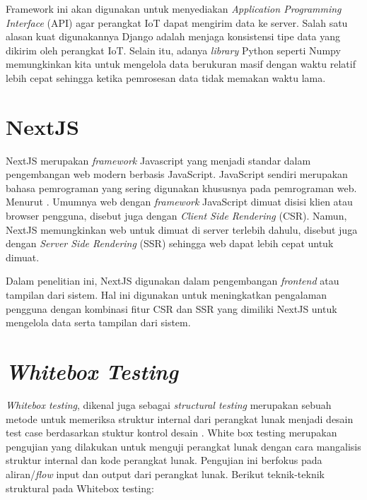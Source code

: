 Framework ini akan digunakan untuk menyediakan \textit{Application Programming Interface} (API) agar perangkat IoT dapat mengirim data ke server. Salah satu alasan kuat digunakannya Django adalah menjaga konsistensi tipe data yang dikirim oleh perangkat IoT. Selain itu, adanya \textit{library} Python seperti Numpy memungkinkan kita untuk mengelola data berukuran masif dengan waktu relatif lebih cepat sehingga ketika pemrosesan data tidak memakan waktu lama.

\section{NextJS}

NextJS merupakan \textit{framework} Javascript yang menjadi standar dalam pengembangan web modern berbasis JavaScript. JavaScript sendiri merupakan bahasa pemrograman yang sering digunakan khususnya pada pemrograman web. Menurut \textcite{article:tomasdottir}. Umumnya web dengan \textit{framework} JavaScript dimuat disisi klien atau browser pengguna, disebut juga dengan \textit{Client Side Rendering}  (CSR). Namun, NextJS memungkinkan web untuk dimuat di server terlebih dahulu, disebut juga dengan \textit{Server Side Rendering} (SSR) sehingga web dapat lebih cepat untuk dimuat.

Dalam penelitian ini, NextJS digunakan dalam pengembangan \textit{frontend} atau tampilan dari sistem. Hal ini digunakan untuk meningkatkan pengalaman pengguna dengan kombinasi fitur CSR dan SSR yang dimiliki NextJS untuk mengelola data serta tampilan dari sistem.

\section{\textit{Whitebox Testing}}

\textit{Whitebox testing}, dikenal juga sebagai \textit{structural testing} merupakan sebuah metode untuk memeriksa struktur internal dari perangkat lunak menjadi desain test case berdasarkan stuktur kontrol desain \parencite{article:nidhra}. White box testing merupakan pengujian yang dilakukan untuk menguji perangkat lunak dengan cara mangalisis struktur internal dan kode perangkat lunak. Pengujian ini berfokus pada aliran/\textit{flow} input dan output dari perangkat lunak. Berikut teknik-teknik struktural pada Whitebox testing:

